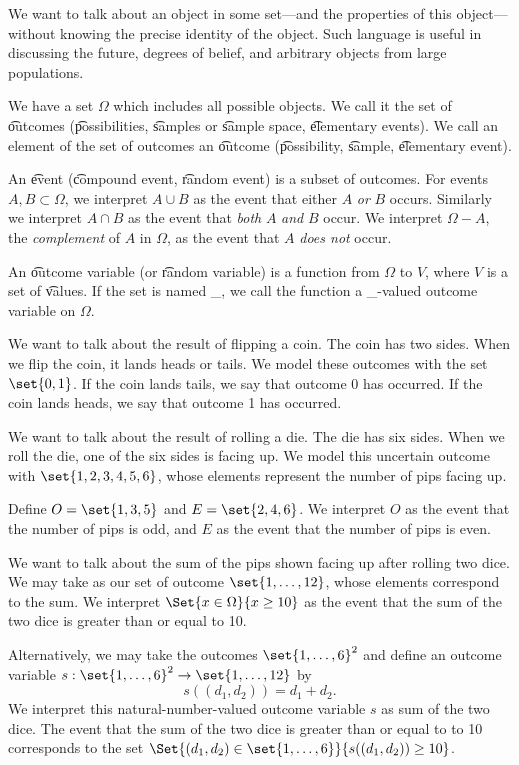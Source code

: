 

We want to talk about an object in some set---and the properties of this object---without knowing the precise identity of the object.
Such language is useful in discussing the future, degrees of belief, and arbitrary objects from large populations.


We have a set $\Omega $ which includes all possible objects.
We call it the set of \t{outcomes} (\t{possibilities}, \t{samples} or \t{sample space}, \t{elementary events}).
We call an element of the set of outcomes an \t{outcome} (\t{possibility}, \t{sample}, \t{elementary event}).

An \t{event} (\t{compound event}, \t{random event}) is a subset of outcomes.
For events $A, B \subset \Omega $, we interpret $A \cup B$ as the event that either $A$ \textit{or} $B$ occurs.
Similarly we interpret $A \cap B$ as the event that \textit{both} $A$ \textit{and} $B$ occur.
We interpret $\Omega  - A$, the \textit{complement} of $A$ in $\Omega $, as the event that $A$ \textit{does not} occur.

An \t{outcome variable} (or \t{random variable}) is a function from $\Omega $ to $V$, where $V$ is a set of \t{values}.
If the set is named \_, we call the function a \_-valued outcome variable on $\Omega $.


We want to talk about the result of flipping a coin.
The coin has two sides.
When we flip the coin, it lands heads or tails.
We model these outcomes with the set $\set{0, 1}$.
If the coin lands tails, we say that outcome 0 has occurred.
If the coin lands heads, we say that outcome 1 has occurred.


We want to talk about the result of rolling a die.
The die has six sides.
When we roll the die, one of the six sides is facing up.
We model this uncertain outcome with $\set{1, 2, 3, 4, 5, 6}$, whose elements represent the number of pips facing up.

Define $O = \set{1, 3, 5}$ and $E = \set{2, 4, 6}$.
We interpret $O$ as the event that the number of pips is odd, and $E$ as the event that the number of pips is even.


We want to talk about the sum of the pips shown facing up after rolling two dice.
We may take as our set of outcome $\set{1, \dots , 12}$, whose elements correspond to the sum.
We interpret $\Set{x \in \Omega }{x \geq 10}$ as the event that the sum of the two dice is greater than or equal to 10.

Alternatively, we may take the outcomes $\set{1, \dots , 6}^2$ and define an outcome variable $s: \set{1, \dots , 6}^2 \to \set{1, \dots , 12}$ by
  \[
s((d_1, d_2)) = d_1 + d_2.
  \]
We interpret this natural-number-valued outcome variable $s$ as sum of the two dice.
The event that the sum of the two dice is greater than or equal to to 10 corresponds to the set $\Set{(d_1, d_2) \in \set{1, \dots , 6}}{s((d_1, d_2)) \geq 10}$.
